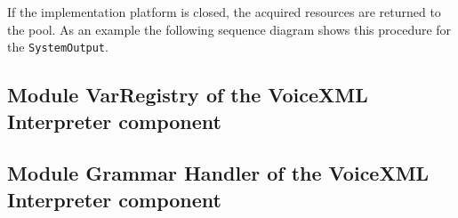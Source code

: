 \documentclass[11pt,a4paper]{article}
\begin{document}
If the implementation platform is closed, the acquired resources are returned
to the pool. As an example the following sequence diagram shows this procedure
for the \texttt{SystemOutput}.

\begin{center}
\end{center}

\subsection{Module VarRegistry of the VoiceXML Interpreter component}
\label{sec:module-varr-voic}

\subsection{Module Grammar Handler of the 
VoiceXML Interpreter component}
\end{document}
